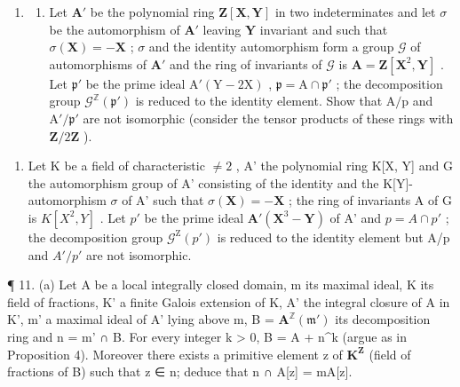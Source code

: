 \begin{enumerate}
\def\labelenumi{\arabic{enumi}.}
\setcounter{enumi}{9}
\tightlist
\item
  \begin{enumerate}
  \def\labelenumii{(\alph{enumii})}
  \tightlist
  \item
    Let \(\mathbf{A}'\) be the polynomial ring \(\mathbf{Z}[\mathbf{X},\mathbf{Y}]\) in two indeterminates and let \(\sigma\) be the automorphism of \(\mathbf{A}'\) leaving \(\mathbf{Y}\) invariant and such that \(\sigma (\mathbf{X}) = -\mathbf{X}\) ; \(\sigma\) and the identity automorphism form a group \(\mathcal{G}\) of automorphisms of \(\mathbf{A}'\) and the ring of invariants of \(\mathcal{G}\) is \(\mathbf{A} = \mathbf{Z}[\mathbf{X}^2,\mathbf{Y}]\) . Let \(\mathfrak{p}'\) be the prime ideal \(\mathrm{A}'(\mathrm{Y} - 2\mathrm{X})\) , \(\mathfrak{p} = \mathrm{A}\cap \mathfrak{p}'\) ; the decomposition group \(\mathcal{G}^{\mathbb{Z}}(\mathfrak{p}')\) is reduced to the identity element. Show that \(\mathrm{A / p}\) and \(\mathrm{A}' / \mathfrak{p}'\) are not isomorphic (consider the tensor products of these rings with \(\mathbf{Z} / 2\mathbf{Z}\) ).
  \end{enumerate}
\end{enumerate}

\begin{enumerate}
\def\labelenumi{(\alph{enumi})}
\setcounter{enumi}{1}
\tightlist
\item
  Let K be a field of characteristic \(\neq2\) , A' the polynomial ring K{[}X, Y{]} and G the automorphism group of A' consisting of the identity and the K{[}Y{]}-automorphism \(\sigma\) of A' such that \(\sigma(\mathbf{X}) = -\mathbf{X}\) ; the ring of invariants A of G is \(K[X^{2}, Y]\) . Let \(p'\) be the prime ideal \(\mathbf{A}'(\mathbf{X}^{3} - \mathbf{Y})\) of A' and \(p = A \cap p'\) ; the decomposition group \(\mathcal{G}^{\mathrm{Z}}(p')\) is reduced to the identity element but A/p and \(A'/p'\) are not isomorphic.
\end{enumerate}

¶ 11. (a) Let A be a local integrally closed domain, m its maximal ideal, K its field of fractions, K' a finite Galois extension of K, A' the integral closure of A in K', m' a maximal ideal of A' lying above m, B = \(\mathbf{A}^{\mathbb{Z}}(\mathfrak{m}')\) its decomposition ring and n = m' ∩ B. For every integer k \textgreater{} 0, B = A + n\^{}k (argue as in Proposition 4). Moreover there exists a primitive element z of \(\mathbf{K}^{\mathbf{Z}}\) (field of fractions of B) such that z ∈ n; deduce that n ∩ A{[}z{]} = mA{[}z{]}.

